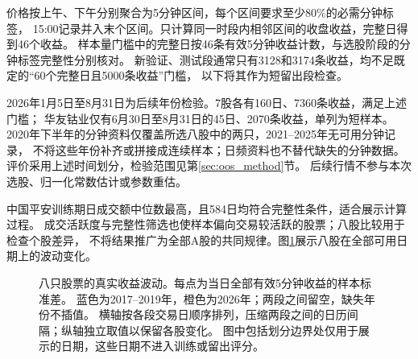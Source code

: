 价格按上午、下午分别聚合为5分钟区间，每个区间要求至少80\%的必需分钟标签，
15:00记录并入末个区间。只计算同一时段内相邻区间的收盘收益，完整日得到46个收益。
样本量门槛中的完整日按46条有效5分钟收益计数，与选股阶段的分钟标签完整性分别核对。
新验证、测试段通常只有3128和3174条收益，均不足既定的“60个完整日且5000条收益”门槛，
以下将其作为短留出段检查。

2026年1月5日至8月31日为后续年份检验。7股各有160日、7360条收益，满足上述门槛；
华友钴业仅有6月30日至8月31日的45日、2070条收益，单列为短样本。
2020年下半年的分钟资料仅覆盖所选八股中的两只，2021--2025年无可用分钟记录，
不将这些年份补齐或拼接成连续样本；日频资料也不替代缺失的分钟数据。
评价采用上述时间划分，检验范围见第\ref{sec:oos_method}节。
后续行情不参与本次选股、归一化常数估计或参数重估。


中国平安训练期日成交额中位数最高，且584日均符合完整性条件，适合展示计算过程。
成交活跃度与完整性筛选也使样本偏向交易较活跃的股票；八股比较用于检查个股差异，
不将结果推广为全部A股的共同规律。图\ref{fig:panel_data}展示八股在全部可用日期上的波动变化。
\clearpage
\begin{figure}[p]\centering
\caption{八只股票的真实收益波动。每点为当日全部有效5分钟收益的样本标准差。
蓝色为2017--2019年，橙色为2026年；两段之间留空，缺失年份不插值。
横轴按各段交易日顺序排列，压缩两段之间的日历间隔；纵轴独立取值以保留各股变化。
图中包括划分边界处仅用于展示的日期，这些日期不进入训练或留出评分。}
\label{fig:panel_data}\end{figure}\clearpage
